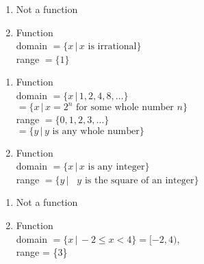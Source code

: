 \begin{multicols}{2}
\begin{enumerate}
\setcounter{enumi}{\value{HW}}

\item  Not a function

\vfill

\columnbreak

\item Function \\ domain $= \{x \, | \, \text{$x$ is irrational} \}$ \\ range $= \{ 1\}$

\setcounter{HW}{\value{enumi}}
\end{enumerate}
\end{multicols}

\begin{multicols}{2}
\begin{enumerate}
\setcounter{enumi}{\value{HW}}

\item Function \\ domain  $= \{x \, | \, 1, 2, 4, 8, \ldots \}$ \\ $= \{x \, | \, \text{$x = 2^{n}$ for some whole number $n$} \}$ \\ range $= \{ 0, 1, 2, 3, \ldots \}$ \\ $= \{y \, | \, \text{$y$ is any whole number}\}$

\vfill

\columnbreak

\item Function \\ domain $= \{x \, | \, \text{$x$ is any integer} \}$ \\ range $= \{y \, | \, \text{ $y$ is the square of an integer}\}$

\setcounter{HW}{\value{enumi}}
\end{enumerate}
\end{multicols}

\begin{multicols}{2}
\begin{enumerate}
\setcounter{enumi}{\value{HW}}

\item Not a function

\vfill

\columnbreak

\item Function \\ domain  $= \{x \, | \, -2 \leq x < 4 \} = [-2, 4)$, \\ range = \{$3$\}

\setcounter{HW}{\value{enumi}}
\end{enumerate}
\end{multicols}

